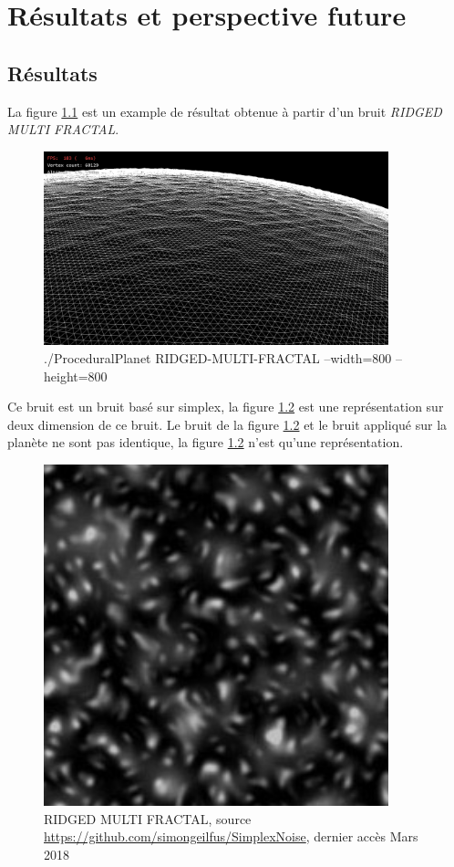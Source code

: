 \chapter{Résultats et perspective future}

\section{Résultats}

La figure \ref{fig:rmf_800} est un example de résultat obtenue à partir d'un bruit \textit{RIDGED MULTI FRACTAL}. 

\begin{figure}
    \centering
    \includegraphics[width=10cm]{img/RMFV_w800_h800_wire_0.png}
    \caption{./ProceduralPlanet RIDGED-MULTI-FRACTAL --width=800 --height=800}
    \label{fig:rmf_800}
\end{figure}

Ce bruit est un bruit basé sur simplex, la figure \ref{fig:rmf} est une représentation sur deux dimension de ce bruit. 
Le bruit de la figure \ref{fig:rmf} et le bruit appliqué sur la planète ne sont pas identique, la figure \ref{fig:rmf} n'est qu'une représentation.

\begin{figure}
    \centering
    \includegraphics[width=10cm]{img/RMF.jpg}
    \caption{RIDGED MULTI FRACTAL, source \url{https://github.com/simongeilfus/SimplexNoise}, dernier accès Mars 2018}
    \label{fig:rmf}
\end{figure}

